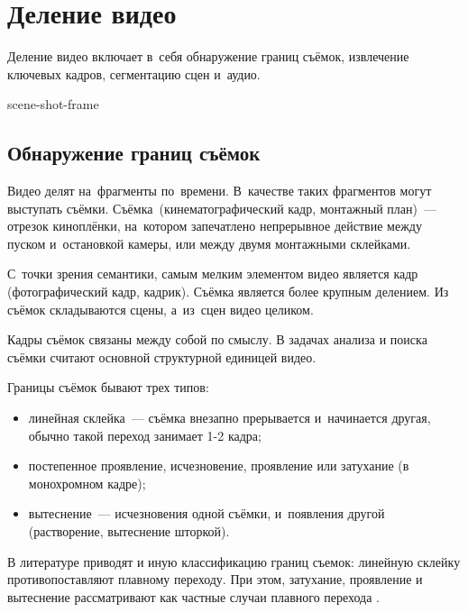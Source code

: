 
\section{Деление видео}

Деление видео включает в~себя обнаружение границ съёмок,
извлечение ключевых кадров, сегментацию сцен и~аудио.

\begin{figured}
    {scene-shot-frame}
\end{figured}

\subsection{Обнаружение границ съёмок}

Видео делят на~фрагменты по~времени.
В~качестве таких фрагментов могут выступать съёмки.
Съёмка\ (кинематографический кадр,
монтажный план)~— отрезок киноплёнки,
на~котором запечатлено непрерывное действие между пуском
и~остановкой камеры, или между двумя монтажными склейками.

С~точки зрения семантики, самым мелким элементом видео является кадр
(фотографический кадр, кадрик).
Съёмка является более крупным делением.
Из съёмок складываются сцены, а~из~сцен видео целиком.

Кадры съёмок связаны между собой по смыслу.
В задачах анализа и поиска съёмки считают
основной структурной единицей видео.

\noindent
Границы съёмок бывают трех типов:
\begin{itemize}
    \item линейная склейка~— съёмка внезапно
            прерывается и~начинается другая,
            обычно такой переход занимает 1-2 кадра;
    \item постепенное проявление, исчезновение, проявление или затухание
            (в монохромном кадре);
    \item вытеснение~— исчезновения одной съёмки,
            и~появления другой (растворение, вытеснение шторкой).
\end{itemize}

В литературе приводят и иную классификацию границ съемок:
линейную склейку противопоставляют плавному переходу.
При этом, затухание, проявление и вытеснение
рассматривают как частные случаи плавного перехода \cite{Hattarge:2014}.

